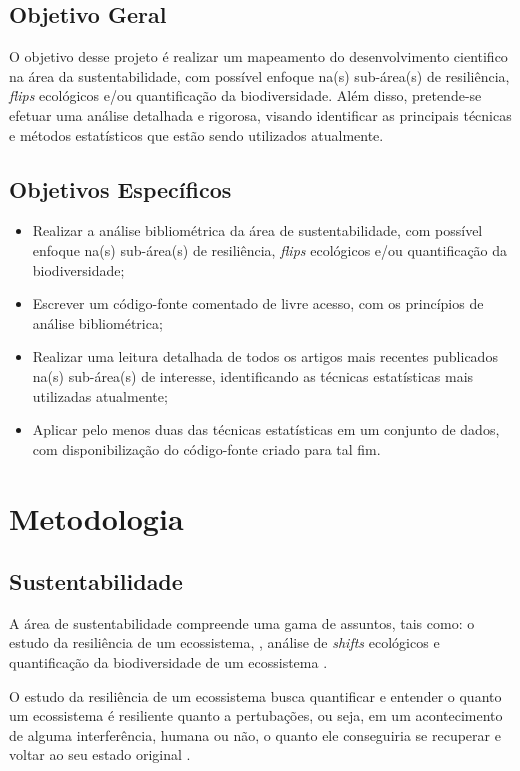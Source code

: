 \documentclass{article}[12pt]
\begin{document}
\subsection{Objetivo Geral}
O objetivo desse projeto é realizar um mapeamento do desenvolvimento cientifico na área da
sustentabilidade, com possível enfoque na(s) sub-área(s) de resiliência, \textit{flips} ecológicos
e/ou quantificação da biodiversidade. Além disso, pretende-se efetuar uma análise detalhada e
rigorosa, visando identificar as principais técnicas e métodos estatísticos que estão sendo
utilizados atualmente. 


\subsection{Objetivos Específicos}

\begin{itemize}
\item Realizar a análise bibliométrica da área de sustentabilidade, com possível enfoque na(s)
sub-área(s) de resiliência, \textit{flips} ecológicos e/ou quantificação da biodiversidade;
\item Escrever um código-fonte comentado de livre acesso, com os princípios de análise
bibliométrica;
\item Realizar uma leitura detalhada de todos os artigos mais recentes publicados na(s) sub-área(s)
de interesse, identificando as técnicas estatísticas mais utilizadas atualmente;
\item Aplicar pelo menos duas das técnicas estatísticas em um conjunto de dados, com
disponibilização do código-fonte criado para tal fim.
\end{itemize}

\section{\textbf{Metodologia}}

\subsection{Sustentabilidade}

A área de sustentabilidade compreende uma gama de assuntos, tais como: o estudo da resiliência de um
ecossistema, %
\cite{Dakos2022, Eason2013, Boschetti2019}, análise de \textit{shifts} ecológicos
\cite{Mayer2006, Clare2017} e quantificação da biodiversidade de um ecossistema
\cite{Sherwin2019, Daly2018, Roswell2021}. \par
O estudo da resiliência de um ecossistema busca quantificar e entender o quanto um ecossistema é
resiliente quanto a pertubações, ou seja, em um acontecimento de alguma interferência, humana ou
não, o quanto ele conseguiria se recuperar e voltar ao seu estado original \cite{Dakos2022}. \par
\end{document}
